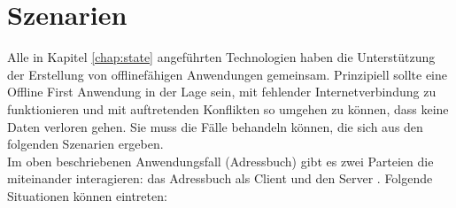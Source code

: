 \chapter{\label{chap:szenarien}Szenarien}
Alle in Kapitel \ref{chap:state} angeführten Technologien haben die Unterstützung der Erstellung von offlinefähigen Anwendungen gemeinsam.
Prinzipiell sollte eine Offline First Anwendung in der Lage sein, mit fehlender Internetverbindung zu funktionieren und mit auftretenden Konflikten so umgehen zu können, dass keine Daten verloren gehen. Sie muss die Fälle behandeln können, die sich aus den folgenden Szenarien ergeben.\\
Im oben beschriebenen Anwendungsfall (Adressbuch) gibt es zwei Parteien die miteinander interagieren: das Adressbuch als Client und den Server . Folgende Situationen können eintreten:
